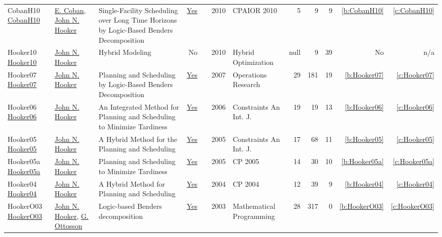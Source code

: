 {\begin{longtable}{>{\raggedright\arraybackslash}p{3cm}>{\raggedright\arraybackslash}p{6cm}>{\raggedright\arraybackslash}p{6.5cm}rrrp{2.5cm}rrrrr}
CobanH10 \href{https://doi.org/10.1007/978-3-642-13520-0\_11}{CobanH10} & \hyperref[auth:a341]{E. Coban}, \hyperref[auth:a162]{John N. Hooker} & Single-Facility Scheduling over Long Time Horizons by Logic-Based Benders Decomposition & \href{../works/CobanH10.pdf}{Yes} & \cite{CobanH10} & 2010 & CPAIOR 2010 & 5 & 9 & 9 & \ref{b:CobanH10} & \ref{c:CobanH10}\\
Hooker10 \href{http://dx.doi.org/10.1007/978-1-4419-1644-0_2}{Hooker10} & \hyperref[auth:a162]{John N. Hooker} & Hybrid Modeling & No & \cite{Hooker10} & 2010 & Hybrid Optimization & null & 9 & 39 & No & n/a\\
Hooker07 \href{http://dx.doi.org/10.1287/opre.1060.0371}{Hooker07} & \hyperref[auth:a162]{John N. Hooker} & Planning and Scheduling by Logic-Based Benders Decomposition & \href{../works/Hooker07.pdf}{Yes} & \cite{Hooker07} & 2007 & Operations Research & 29 & 181 & 19 & \ref{b:Hooker07} & \ref{c:Hooker07}\\
Hooker06 \href{https://doi.org/10.1007/s10601-006-8060-2}{Hooker06} & \hyperref[auth:a162]{John N. Hooker} & An Integrated Method for Planning and Scheduling to Minimize Tardiness & \href{../works/Hooker06.pdf}{Yes} & \cite{Hooker06} & 2006 & Constraints An Int. J. & 19 & 19 & 13 & \ref{b:Hooker06} & \ref{c:Hooker06}\\
Hooker05 \href{https://doi.org/10.1007/s10601-005-2812-2}{Hooker05} & \hyperref[auth:a162]{John N. Hooker} & A Hybrid Method for the Planning and Scheduling & \href{../works/Hooker05.pdf}{Yes} & \cite{Hooker05} & 2005 & Constraints An Int. J. & 17 & 68 & 11 & \ref{b:Hooker05} & \ref{c:Hooker05}\\
Hooker05a \href{https://doi.org/10.1007/11564751\_25}{Hooker05a} & \hyperref[auth:a162]{John N. Hooker} & Planning and Scheduling to Minimize Tardiness & \href{../works/Hooker05a.pdf}{Yes} & \cite{Hooker05a} & 2005 & CP 2005 & 14 & 30 & 10 & \ref{b:Hooker05a} & \ref{c:Hooker05a}\\
Hooker04 \href{https://doi.org/10.1007/978-3-540-30201-8\_24}{Hooker04} & \hyperref[auth:a162]{John N. Hooker} & A Hybrid Method for Planning and Scheduling & \href{../works/Hooker04.pdf}{Yes} & \cite{Hooker04} & 2004 & CP 2004 & 12 & 39 & 9 & \ref{b:Hooker04} & \ref{c:Hooker04}\\
HookerO03 \href{http://dx.doi.org/10.1007/s10107-003-0375-9}{HookerO03} & \hyperref[auth:a162]{John N. Hooker}, \hyperref[auth:a865]{G. Ottosson} & Logic-based Benders decomposition & \href{../works/HookerO03.pdf}{Yes} & \cite{HookerO03} & 2003 & Mathematical Programming & 28 & 317 & 0 & \ref{b:HookerO03} & \ref{c:HookerO03}\\

\end{longtable}}
